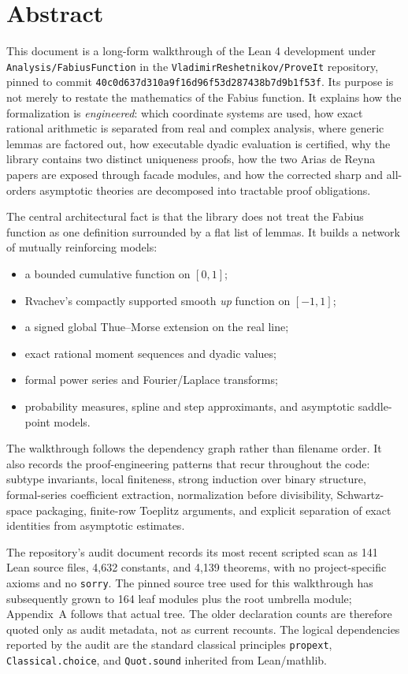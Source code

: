 \documentclass[11pt,a4paper,openany]{book}
\newcommand{\commit}{\nolinkurl{40c0d637d310a9f16d96f53d287438b7d9b1f53f}}
\newcommand{\pathbreak}[1]{\nolinkurl{#1}}
\begin{document}
\chapter*{Abstract}
This document is a long-form walkthrough of the Lean 4 development under
\pathbreak{Analysis/FabiusFunction} in the \pathbreak{VladimirReshetnikov/ProveIt}
repository, pinned to commit \commit.  Its purpose is not merely to restate the
mathematics of the Fabius function.  It explains how the formalization is
\emph{engineered}: which coordinate systems are used, how exact rational
arithmetic is separated from real and complex analysis, where generic lemmas
are factored out, how executable dyadic evaluation is certified, why the
library contains two distinct uniqueness proofs, how the two Arias de Reyna
papers are exposed through facade modules, and how the corrected sharp and
all-orders asymptotic theories are decomposed into tractable proof obligations.

The central architectural fact is that the library does not treat the Fabius
function as one definition surrounded by a flat list of lemmas.  It builds a
network of mutually reinforcing models:
\begin{itemize}
  \item a bounded cumulative function on $[0,1]$;
  \item Rvachev's compactly supported smooth \emph{up} function on $[-1,1]$;
  \item a signed global Thue--Morse extension on the real line;
  \item exact rational moment sequences and dyadic values;
  \item formal power series and Fourier/Laplace transforms;
  \item probability measures, spline and step approximants, and asymptotic
        saddle-point models.
\end{itemize}
The walkthrough follows the dependency graph rather than filename order.  It
also records the proof-engineering patterns that recur throughout the code:
subtype invariants, local finiteness, strong induction over binary structure,
formal-series coefficient extraction, normalization before divisibility,
Schwartz-space packaging, finite-row Toeplitz arguments, and explicit
separation of exact identities from asymptotic estimates.

\begin{dependency}
The repository's audit document records its most recent scripted scan as 141
Lean source files, 4,632 constants, and 4,139 theorems, with no
project-specific axioms and no \texttt{sorry}.  The pinned source tree used for
this walkthrough has subsequently grown to 164 leaf modules plus the root
umbrella module; Appendix~A follows that actual tree.  The older declaration
counts are therefore quoted only as audit metadata, not as current recounts.
The logical dependencies reported by the audit are the standard classical
principles \texttt{propext}, \texttt{Classical.choice}, and
\texttt{Quot.sound} inherited from Lean/mathlib.
\end{dependency}
\end{document}
